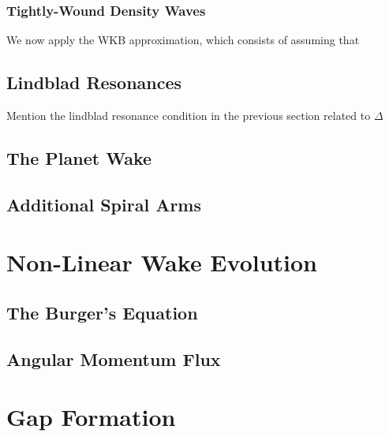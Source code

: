 \subsubsection{Tightly-Wound Density Waves}

We now apply the WKB approximation, which consists of assuming that 

\subsection{Lindblad Resonances}

Mention the lindblad resonance condition in the previous section related to $\Delta$

\subsection{The Planet Wake}


\subsection{Additional Spiral Arms}

\section{Non-Linear Wake Evolution}

\subsection{The Burger's Equation}

\subsection{Angular Momentum Flux}

\section{Gap Formation}
